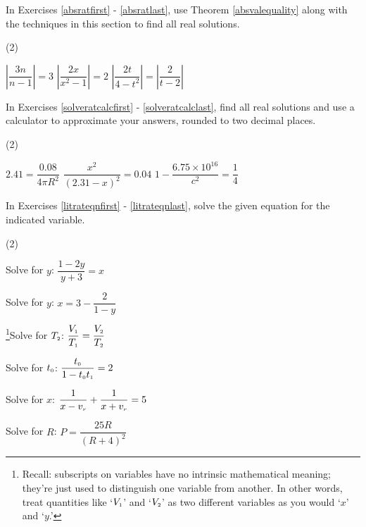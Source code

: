 In Exercises \ref{absratfirst} - \ref{absratlast}, use Theorem \ref{absvalequality} along with the techniques in this section to find all real solutions.

\begin{tasks}[resume](2)

\task $\left|\dfrac{3n}{n-1}  \right| = 3$ \label{absratfirst}
\task $\left| \dfrac{2x}{x^2-1}\right| = 2$
\task $\left| \dfrac{2t}{4-t^2}\right| = \left|\dfrac{2}{t-2}\right|$ \label{absratlast}

\end{tasks}

In Exercises \ref{solveratcalcfirst} - \ref{solveratcalclast}, find all real solutions and use a calculator to approximate your answers, rounded to two decimal places.

\begin{tasks}[resume](2)

\task $2.41 = \dfrac{0.08}{4 \pi R^2}$ \label{solveratcalcfirst}
\task $\dfrac{x^2}{(2.31 -x)^2} = 0.04$
\task $1 - \dfrac{6.75 \times 10^{16}}{c^2} = \dfrac{1}{4}$ \label{solveratcalclast}

\end{tasks}

In Exercises \ref{litrateqnfirst} - \ref{litrateqnlast}, solve the given equation for the indicated variable.

\begin{tasks}[resume](2)

\task Solve for $y$:  $\dfrac{1-2y}{y+3} = x$ \label{litrateqnfirst}

\task Solve for $y$: $x = 3 - \dfrac{2}{1-y}$ 

\task\hspace{-0.1in}\footnote{Recall: subscripts on variables have no intrinsic mathematical meaning; they're just used to distinguish one variable from another.  In other words, treat quantities like `$V_{\text{\tiny $1$}}$' and `$V_{\text{\tiny $2$}}$'  as two different variables as you would `$x$' and `$y$.'}Solve for $T_{\text{\tiny $2$}}$:  $\dfrac{V_{\text{\tiny $1$}}}{T_{\text{\tiny $1$}}} = \dfrac{V_{\text{\tiny $2$}}}{T_{\text{\tiny $2$}}}$


\task  Solve for $t_{\text{\tiny $0$}}$:  $\dfrac{t_{\text{\tiny $0$}}}{1-t_{\text{\tiny $0$}}t_{\text{\tiny $1$}}} = 2$ 


\task  Solve for $x$:  $\dfrac{1}{x - v_{\text{\tiny $r$}}} + \dfrac{1}{x + v_{\text{\tiny $r$}}} = 5$

\task Solve for $R$:  $P = \dfrac{25R}{(R+4)^2}$ \label{litrateqnlast}

\end{tasks}

